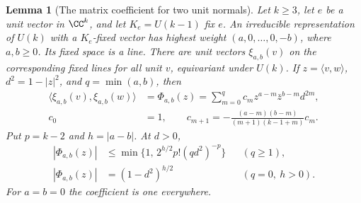 \documentclass[a4paper,11pt]{article}
\newtheorem{lemma}[proposition]{Lemma}
\theoremstyle{definition}
\theoremstyle{remark}
\numberwithin{equation}{section}
\begin{document}
\begin{lemma}[The matrix coefficient for two unit normals]
\leavevmode\label{lem:normalkernel610}
Let \(k\ge3\), let \(e\) be a unit vector in \(\CC^k\), and let
\(K_e=U(k-1)\) fix \(e\). An irreducible representation of \(U(k)\)
with a \(K_e\)-fixed vector has highest weight
\((a,0,\ldots,0,-b)\), where \(a,b\ge0\). Its fixed space is a line.
There are unit vectors \(\xi_{a,b}(v)\) on the corresponding fixed
lines for all unit \(v\), equivariant under \(U(k)\). If
\(z=\langle v,w\rangle\), \(d^2=1-|z|^2\), and \(q=\min(a,b)\), then
\begin{equation}
 \begin{split}
 \langle \xi_{a,b}(v),\xi_{a,b}(w)\rangle
   &=\Phi_{a,b}(z)=\sum_{m=0}^q c_m z^{a-m}\bar z^{b-m}d^{2m},\\
 c_0&=1,\qquad
 c_{m+1}=-\frac{(a-m)(b-m)}{(m+1)(k-1+m)}c_m .
 \end{split}
 \label{eq:normalkernel610}
\end{equation}
Put \(p=k-2\) and \(h=|a-b|\). At \(d>0\),
\begin{equation}
 \begin{aligned}
 |\Phi_{a,b}(z)|&\le \min\{1,\,2^{h/2}p!(q d^2)^{-p}\}
                      &&(q\ge1),\\
 |\Phi_{a,b}(z)|&=(1-d^2)^{h/2}
                      &&(q=0,\ h>0).
 \end{aligned}
 \label{eq:normaldecay610}
\end{equation}
For \(a=b=0\) the coefficient is one everywhere.
\end{lemma}
\end{document}
